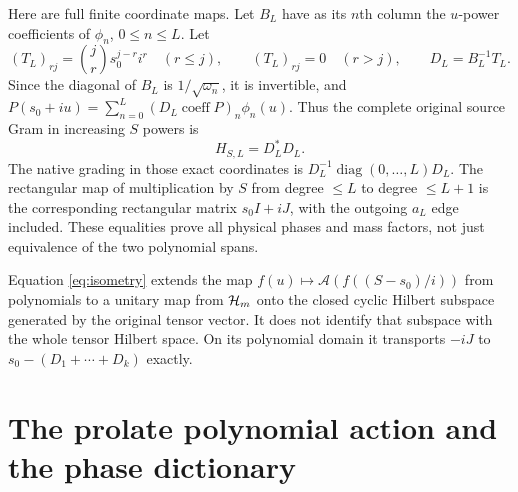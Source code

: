 \documentclass[11pt]{article}
\begin{document}
Here are full finite coordinate maps. Let $B_L$ have as its
$n$th column the $u$-power coefficients of $\phi_n$, $0\leq n\leq L$.
Let
\begin{equation}\label{eq:coordinates}
 (T_L)_{rj}=\binom jr s_0^{j-r}i^r\quad(r\leq j),\qquad
 (T_L)_{rj}=0\quad(r>j),\qquad
 D_L=B_L^{-1}T_L.
\end{equation}
Since the diagonal of $B_L$ is $1/\sqrt{\omega_n}$,
it is invertible, and
$P(s_0+iu)=\sum_{n=0}^L(D_L\operatorname{coeff}P)_n\phi_n(u)$.
Thus the complete original source Gram in increasing $S$ powers is
\begin{equation}\label{eq:sourcegram}
 H_{S,L}=D_L^*D_L.
\end{equation}
The native grading in those exact coordinates is
$D_L^{-1}\operatorname{diag}(0,\ldots,L)D_L$.
The rectangular map of multiplication by $S$ from degree
$\leq L$ to degree $\leq L+1$ is the corresponding rectangular
matrix $s_0I+iJ$, with the outgoing $a_L$ edge included.
These equalities prove all physical phases and mass factors,
not just equivalence of the two polynomial spans.

Equation \eqref{eq:isometry} extends the map
$f(u)\mapsto\mathcal A(f((S-s_0)/i))$ from polynomials to
a unitary map from $\mathcal H_m$ onto the closed cyclic Hilbert
subspace generated by the original tensor vector.
It does not identify that subspace with the whole tensor
Hilbert space. On its polynomial domain it transports
$-iJ$ to $s_0-(D_1+\cdots+D_k)$ exactly.

\section{The prolate polynomial action and the phase dictionary}
\end{document}
